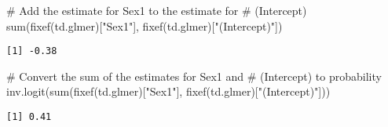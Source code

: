 \documentclass[
  10pt,
  letterpaper]{article}
\newenvironment{Shaded}{\begin{snugshade}}{\end{snugshade}}
\newcommand{\CommentTok}[1]{\textcolor[rgb]{0.37,0.37,0.37}{#1}}
\newcommand{\FunctionTok}[1]{\textcolor[rgb]{0.28,0.35,0.67}{#1}}
\newcommand{\NormalTok}[1]{\textcolor[rgb]{0.00,0.23,0.31}{#1}}
\newcommand{\StringTok}[1]{\textcolor[rgb]{0.13,0.47,0.30}{#1}}
\begin{document}
\begin{Shaded}
\begin{Highlighting}[]
\CommentTok{\# Add the estimate for Sex1 to the estimate for}
\CommentTok{\# (Intercept)}
\FunctionTok{sum}\NormalTok{(}\FunctionTok{fixef}\NormalTok{(td.glmer)[}\StringTok{"Sex1"}\NormalTok{], }\FunctionTok{fixef}\NormalTok{(td.glmer)[}\StringTok{"(Intercept)"}\NormalTok{])}
\end{Highlighting}
\end{Shaded}

\begin{verbatim}
[1] -0.38
\end{verbatim}

\begin{Shaded}
\begin{Highlighting}[]
\CommentTok{\# Convert the sum of the estimates for Sex1 and}
\CommentTok{\# (Intercept) to probability}
\FunctionTok{inv.logit}\NormalTok{(}\FunctionTok{sum}\NormalTok{(}\FunctionTok{fixef}\NormalTok{(td.glmer)[}\StringTok{"Sex1"}\NormalTok{], }\FunctionTok{fixef}\NormalTok{(td.glmer)[}\StringTok{"(Intercept)"}\NormalTok{]))}
\end{Highlighting}
\end{Shaded}

\begin{verbatim}
[1] 0.41
\end{verbatim}
\end{document}
